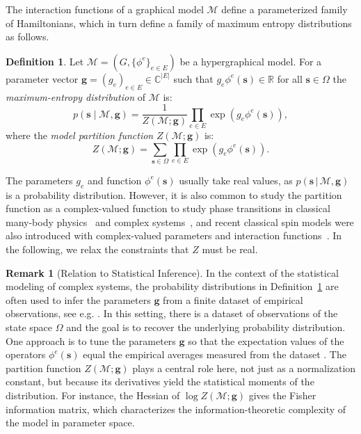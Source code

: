 \documentclass[11pt,reqno]{amsart}
\newcommand{\vecs}{\boldsymbol{s}}
\newcommand{\vecg}{\boldsymbol{g}}
\newcommand{\Mo}{\mathcal{M}}
\newcommand{\statespace}{\Omega}
\theoremstyle{plain}
\theoremstyle{definition}
\newtheorem{definition}[theorem]{Definition}
\newtheorem{remark}[theorem]{Remark}
\numberwithin{equation}{section}
\begin{document}
The interaction functions of a graphical model $\Mo$ define a parameterized family of Hamiltonians, which in turn define a family of maximum entropy distributions as follows.  

\begin{definition}
\label{def:maxent}
Let $\Mo = (G, \{\phi^e\}_{e \in E})$ be a hypergraphical model. For a parameter vector $\vecg = (g_e)_{e \in E} \in \mathbb{C}^{|E|}$ such that $g_e \phi^e(\vecs) \in \mathbb{R}$ for all $\vecs \in \statespace$ the \emph{maximum-entropy distribution} of $\Mo$ is:
\[
    p(\vecs \mid \Mo, \vecg) = \frac{1}{Z(\Mo; \vecg)} \prod_{e \in E} \exp\left( g_e \phi^e(\vecs) \right),
\]
where the \emph{model partition function} $Z(\Mo ; \vecg)$ is:
\[
    Z(\Mo; \vecg) = \sum_{\vecs \in \Omega} \prod_{e \in E} \exp\left( g_e \phi^e(\vecs) \right).
\]
\end{definition}

The parameters $g_e$ and function $\phi^e(\vecs)$ usually take real values, as $p(\vecs\,|\,\Mo, \vecg)$ is a probability distribution.
However, it is also common to study the partition function as a complex-valued function to study phase transitions in classical many-body physics~\cite{yang1952statistical} and complex systems~\cite{krasnytska2015violation, krasnytska2016partition}, and recent classical spin models were also introduced with complex-valued parameters and interaction functions~\cite{deClercq2026}.
In the following, we relax the constraints that $Z$ must be real. 

\begin{remark}[Relation to Statistical Inference]
    In the context of the statistical modeling of complex systems, the probability distributions in Definition~\ref{def:maxent} are often used to infer the parameters $\vecg$ from a finite dataset of empirical observations, see e.g. \cite{Nguyen2017, spinmod, clelbayes}. In this setting, there is a dataset of observations of the state space $\Omega$ and the goal is to recover the underlying probability distribution. One approach is to tune the parameters $\vecg$ so that the expectation values of the operators $\phi^e(\vecs)$ equal the empirical averages measured from the dataset \cite{PhysRev.106.620}. The partition function $Z(\Mo; \vecg)$ plays a central role here, not just as a normalization constant, but because its derivatives yield the statistical moments of the distribution. For instance, the Hessian of $\log Z(\Mo; \vecg)$ gives the Fisher information matrix, which characterizes the information-theoretic complexity of the model in parameter space.
\end{remark}
\end{document}
